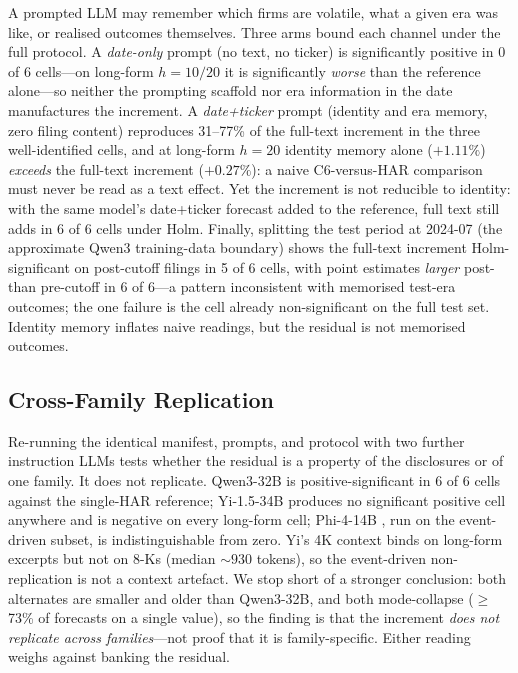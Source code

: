 A prompted LLM may remember which firms are volatile, what a given era was like, or realised outcomes themselves. Three arms bound each channel under the full protocol. A \emph{date-only} prompt (no text, no ticker) is significantly positive in 0 of 6 cells---on long-form $h{=}10/20$ it is significantly \emph{worse} than the reference alone---so neither the prompting scaffold nor era information in the date manufactures the increment. A \emph{date{+}ticker} prompt (identity and era memory, zero filing content) reproduces 31--77\% of the full-text increment in the three well-identified cells, and at long-form $h{=}20$ identity memory alone ($+1.11\%$) \emph{exceeds} the full-text increment ($+0.27\%$): a naive C6-versus-HAR comparison must never be read as a text effect. Yet the increment is not reducible to identity: with the same model's date{+}ticker forecast added to the reference, full text still adds in 6 of 6 cells under Holm. Finally, splitting the test period at 2024-07 (the approximate Qwen3 training-data boundary) shows the full-text increment Holm-significant on post-cutoff filings in 5 of 6 cells, with point estimates \emph{larger} post- than pre-cutoff in 6 of 6---a pattern inconsistent with memorised test-era outcomes; the one failure is the cell already non-significant on the full test set. Identity memory inflates naive readings, but the residual is not memorised outcomes.

\subsection{Cross-Family Replication}
\label{sec:ab-family}

Re-running the identical manifest, prompts, and protocol with two further instruction LLMs tests whether the residual is a property of the disclosures or of one family. It does not replicate. Qwen3-32B is positive-significant in 6 of 6 cells against the single-HAR reference; Yi-1.5-34B \citep{yi_2024} produces no significant positive cell anywhere and is negative on every long-form cell; Phi-4-14B \citep{phi4_2024}, run on the event-driven subset, is indistinguishable from zero. Yi's 4K context binds on long-form excerpts but not on 8-Ks (median ${\sim}930$ tokens), so the event-driven non-replication is not a context artefact. We stop short of a stronger conclusion: both alternates are smaller and older than Qwen3-32B, and both mode-collapse ($\geq$73\% of forecasts on a single value), so the finding is that the increment \emph{does not replicate across families}---not proof that it is family-specific. Either reading weighs against banking the residual.

